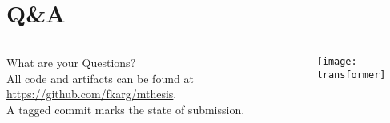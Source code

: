 \section{Q\&A}

\begin{frame}[c]
    \Huge
    \begin{columns}
        \begin{centering}
            \vfill
            \vspace{1em}
            What are your Questions? \\
            \large
            \vspace{3em}
            All code and artifacts can be found at \url{https://github.com/fkarg/mthesis}. \\
            A tagged commit marks the state of submission.
            \vfill
        \end{centering}
        \texttt{[image: transformer]}
    \end{columns}
\end{frame}
